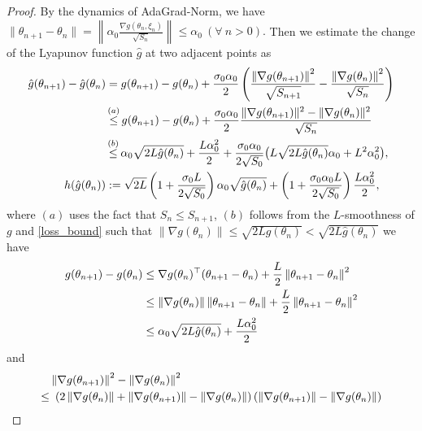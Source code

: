 \documentclass[standalone]{article}
\begin{document}
\begin{proof}%
By the dynamics of AdaGrad-Norm, we have $\|\theta_{n+1}-\theta_{n}\| = \left\|\alpha_0 \frac{\nabla g(\theta_n, \xi_n)}{\sqrt{S_n}}\right\|\le \alpha_{0}\ (\forall\ n>0).$ Then we estimate the change of the Lyapunov function $\hat{g}$ at two adjacent points as
\begin{align*}
\hat{g}(\theta_{n+1})-\hat{g}(\theta_{n})&=g(\theta_{n+1})-g(\theta_{n})+\frac{\sigma_{0}\alpha_{0}}{2}\left(\frac{\left\|\nabla g(\theta_{n+1}) \right\|^2}{\sqrt{S_{n+1}}}-\frac{\left\|\nabla g(\theta_{n}) \right\|^2}{\sqrt{S_{n}}}\right) \notag\\& \mathop{\le}^{(a)} g(\theta_{n+1})-g(\theta_{n})+\frac{\sigma_{0}\alpha_{0}}{2}\frac{\|\nabla g(\theta_{n+1})\|^{2}-\|\nabla g(\theta_{n})\|^{2}}{\sqrt{S_{n}}}
\notag\\&\mathop{\le}^{(b)} \alpha_0\sqrt{2 L\hat{g}(\theta_{n})}+\frac{ L\alpha_0^2}{2} +\frac{\sigma_{0}\alpha_{0}}{2\sqrt{S_{0}}}\big( L\sqrt{2 L\hat{g}(\theta_{n})} \alpha_0 +  L^{2}\alpha_0^2\big), \notag \\
h(\hat{g}(\theta_{n})) & := \sqrt{2 L}\left(1 + \frac{\sigma_0 L}{2\sqrt{S_0}}\right)\alpha_0\sqrt{\hat{g}(\theta_n)} + \left(1  + \frac{\sigma_0\alpha_0 L}{2\sqrt{S_0}}\right)\frac{ L\alpha_0^2}{2},
\end{align*}
{where $(a)$ uses the fact that $S_n \leq S_{n+1}$, $(b)$ follows from the $ L$-smoothness of $g$ and \cref{loss_bound} such that $\|\nabla g(\theta_{n})\|\le \sqrt{2 Lg(\theta_{n})}<\sqrt{2 L\hat{g}(\theta_{n})}$ we have
\begin{align}\label{inequ:g:adj} 
 g(\theta_{n+1}) - g(\theta_n) &\leq \nabla g(\theta_n)^{\top}(\theta_{n+1} - \theta_n) + \frac{ L}{2}\left\|\theta_{n+1} - \theta_n \right\|^2  \notag \\
& \leq \left\|\nabla g(\theta_n)\right\|\left\|\theta_{n+1} - \theta_n\right\|  +\frac{ L}{2}\left\|\theta_{n+1} - \theta_n \right\|^2 \notag\\& \leq \alpha_0\sqrt{2 L\hat{g}(\theta_n)} +\frac{ L\alpha_0^2}{2} 
\end{align}
}
and
\begin{align}
& \left\| \nabla g(\theta_{n+1})\right\|^2 -\left\| \nabla g(\theta_{n})  \right\|^2 \notag \\
\leq &\ \left(2\left\| \nabla g(\theta_{n})\right\| + \left\| \nabla g(\theta_{n+1})\right\| -\left\| \nabla g(\theta_{n})  \right\|\right)\left(\left\| \nabla g(\theta_{n+1})\right\| -\left\| \nabla g(\theta_{n})  \right\|\right) \notag \\

\end{align}
\end{proof}
\end{document}
